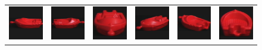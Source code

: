 \begin{figure}[p]
\begin{center}
\begin{tabular}{cccccc}
\includegraphics[width=2cm]{coil/beeld-18.eps} &
\includegraphics[width=2cm]{coil/beeld-19.eps} &
\includegraphics[width=2cm]{coil/beeld-20.eps} &
\includegraphics[width=2cm]{coil/beeld-21.eps} &
\includegraphics[width=2cm]{coil/beeld-22.eps} &
\includegraphics[width=2cm]{coil/beeld-23.eps} \\


\end{tabular}
\end{center}
\end{figure}
